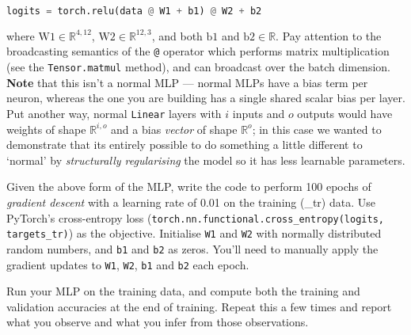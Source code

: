 \documentclass[a4paper]{article}
\begin{document}
\begin{lstlisting}[language=Python]
	logits = torch.relu(data @ W1 + b1) @ W2 + b2
\end{lstlisting}

where $\mathrm{W1} \in \mathbb{R}^{4,12}$, $\mathrm{W2} \in \mathbb{R}^{12,3}$, and both $\mathrm{b1}$ and $\mathrm{b2} \in \mathbb{R}$. Pay attention to the broadcasting semantics of the \verb|@| operator which performs matrix multiplication (see the \verb|Tensor.matmul| method), and can broadcast over the batch dimension. \textbf{Note} that this isn't a normal MLP --- normal MLPs have a bias term per neuron, whereas the one you are building has a single shared scalar bias per layer. Put another way, normal \verb|Linear| layers with $i$ inputs and $o$ outputs would have weights of shape $\mathbb{R}^{i,o}$ and a bias \emph{vector} of shape $\mathbb{R}^{o}$; in this case we wanted to demonstrate that its entirely possible to do something a little different to `normal' by \emph{structurally regularising} the model so it has less learnable parameters.

\begin{tcolorbox}[title=2.1 Implement the MLP (1 mark)]
Given the above form of the MLP, write the code to perform 100 epochs of \textit{gradient descent} with a learning rate of 0.01 on the training (\_tr) data. Use PyTorch's cross-entropy loss (\texttt{torch.nn.functional.cross\_entropy(logits, targets\_tr)}) as the objective. Initialise \texttt{W1} and \texttt{W2} with normally distributed random numbers, and \texttt{b1} and \texttt{b2} as zeros. You'll need to manually apply the gradient updates to \texttt{W1}, \texttt{W2}, \texttt{b1} and \texttt{b2} each epoch.
\end{tcolorbox}

\begin{tcolorbox}[title=2.2 Test the MLP (1 mark)]
Run your MLP on the training data, and compute both the training and validation accuracies at the end of training. Repeat this a few times and report what you observe and what you infer from those observations. 
\end{tcolorbox}
\end{document}
